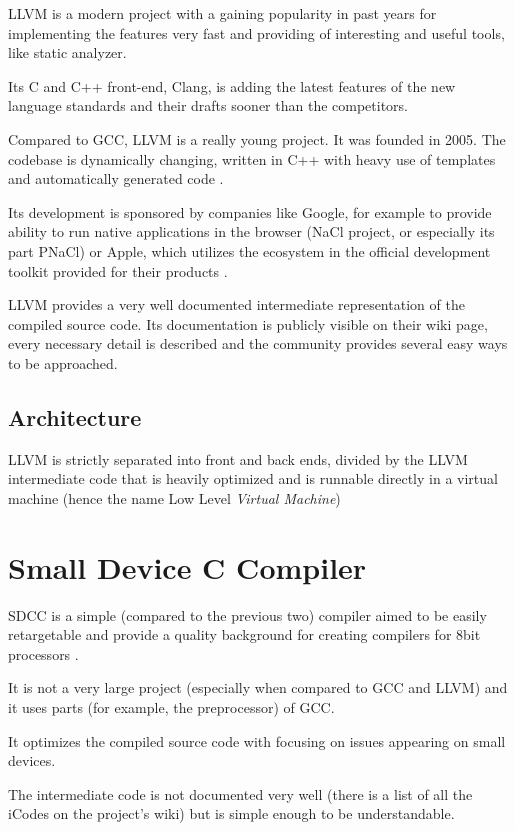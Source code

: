     LLVM is a modern project with a gaining popularity in past years for implementing the features very fast and providing of interesting and useful tools, like static analyzer.

    Its C and C++ front-end, Clang, is adding the latest features of the new language standards and their drafts sooner than the competitors.

    Compared to GCC, LLVM is a really young project. It was founded in 2005. The codebase is dynamically changing, written in C++ with heavy use of templates and automatically generated code \cite{LlvmWeb}.

    Its development is sponsored by companies like Google, for example to provide ability to run native applications in the browser (NaCl project, or especially its part PNaCl) or Apple, which utilizes the ecosystem in the official development toolkit provided for their products \cite{LlvmApple} \cite{LlvmNacl}.

    LLVM provides a very well documented intermediate representation of the compiled source code. Its documentation is publicly visible on their wiki page, every necessary detail is described and the community provides several easy ways to be approached.

        \subsection{Architecture}

        LLVM is strictly separated into front and back ends, divided by the LLVM intermediate code that is heavily optimized and is runnable directly in a virtual machine (hence the name Low Level \emph{Virtual Machine})

    \section{Small Device C Compiler}\label{sdcc}

    SDCC is a simple (compared to the previous two) compiler aimed to be easily retargetable and provide a quality background for creating compilers for 8bit processors \cite{SdccWeb}.

    It is not a very large project (especially when compared to GCC and LLVM) and it uses parts (for example, the preprocessor) of GCC.

    It optimizes the compiled source code with focusing on issues appearing on small devices.

    The intermediate code is not documented very well (there is a list of all the iCodes on the project's wiki) but is simple enough to be understandable.

